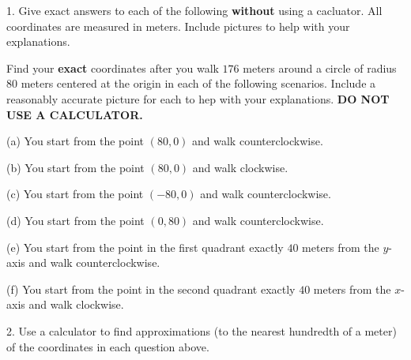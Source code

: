 \documentclass{ximera}
\newcommand{\pskip}{\vskip 0.1 in}
\begin{document}
\begin{question}  \label{Q2354234:Cosine}
1. Give exact answers to each of the following {\bf without} using a cacluator. All coordinates are measured in meters. Include pictures to help with your explanations.


Find  your {\bf exact} coordinates after you walk $176$ meters around a circle of radius $80$ meters centered at the origin in each of the following scenarios. Include a reasonably accurate picture for each to hep with your explanations. {\bf DO NOT USE A CALCULATOR.}  

(a) You start from the point $(80,0)$ and walk counterclockwise.

(b) You start from the point $(80,0)$ and walk clockwise.

(c) You start from the point $(-80,0)$ and walk counterclockwise.

(d) You start from the point $(0,80)$ and walk counterclockwise.

(e) You start from the point in the first quadrant exactly $40$ meters from the $y$-axis and walk counterclockwise.

(f) You start from the point in the second quadrant exactly $40$ meters from the $x$-axis and walk clockwise.

2. Use a calculator to find approximations (to the nearest hundredth of a meter) of the coordinates in each question above.







\end{question}
\end{document}
